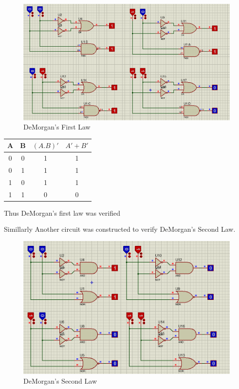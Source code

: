 \documentclass[a4paper, 12pt]{article}
\begin{document}
\begin{figure}[h]
  \centering
  \includegraphics[scale=0.55]{deMorgan1}
  \caption{DeMorgan's First Law}
\end{figure} 

\begin{center}
  \begin{tabular}{|c|c|c|c|}
    \hline
    A & B & $(A.B)'$ & $A' + B'$ \\
    \hline
    0 & 0 & 1 & 1 \\
    0 & 1 & 1 & 1 \\
    1 & 0 & 1 & 1 \\
    1 & 1 & 0 & 0 \\
    \hline
  \end{tabular}
\end{center}
Thus DeMorgan's first law was verified

\pagebreak

Simillarly Another circuit was constructed to verify DeMorgan's Second Law.
\begin{figure}[h]
  \centering
  \includegraphics[scale=0.6]{deMorgan2.png}
  \caption{DeMorgan's Second Law}
\end{figure} 
\end{document}
